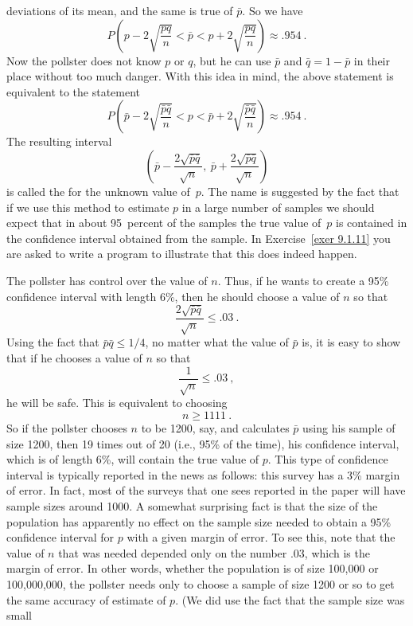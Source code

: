 \begin{example}
deviations of its mean, and the same is true of $\bar p$.  So we have
$$P\left(p - 2\sqrt{\frac{pq}{n}} < \bar p < p + 2\sqrt{\frac{pq}{n}}\right) \approx .954\
.$$
Now the pollster does not know $p$ or $q$, but he can use $\bar p$ and $\bar q = 1 -
\bar p$ in their place without too much danger.  With this idea in mind, the above
statement is equivalent to the statement
$$P\left(\bar p - 2\sqrt{\frac{\bar p \bar q}{n}} < p <
\bar p + 2\sqrt{\frac{\bar p \bar q}{n}}\right) \approx .954\ .$$
The resulting interval
$$
\left( \bar p - \frac {2\sqrt{\bar p \bar q}}{\sqrt n},\ 
\bar p + \frac {2\sqrt{\bar p \bar q}}{\sqrt n} \right)
$$
is called the  for the unknown
value of~$p$.  The name is suggested by the fact that if we use this method to
estimate $p$ in a large number of samples we should expect that in about
95~percent of the samples the true value of~$p$ is contained in the confidence
interval obtained from the sample.  In Exercise~\ref{exer 9.1.11} you are asked
to write a program to illustrate that this does indeed happen.
\par
The pollster has control over the value of $n$.  Thus, if he wants to create a 95\% confidence
interval with length 6\%, then he should choose a value of $n$ so that
$$\frac {2\sqrt{\bar p \bar q}}{\sqrt n} \le .03\ .$$
Using the fact that $\bar p \bar q \le 1/4$, no matter what the value of $\bar p$
is, it is easy to show that if he chooses a value of $n$ so that
$$\frac{1}{\sqrt n} \le .03\ ,$$
he will be safe.  This is equivalent to choosing
$$n \ge 1111\ .$$
So if the pollster chooses $n$ to be 1200, say, and calculates $\bar p$ using his
sample of size 1200, then 19 times out of 20 (i.e., 95\% of the time), his confidence interval,
which is of length 6\%, will contain the true value of $p$.  This type of confidence interval is
typically reported in the news as follows:  this survey has a 3\% margin of error.\index{margin
of error}  In fact, most of the surveys that one sees reported in the paper will have sample
sizes around 1000.  A somewhat surprising fact is that the size of the population has apparently
no effect on the sample size needed to obtain a 95\% confidence interval for $p$ with a given
margin of error.  To see this, note that the value of $n$ that was needed depended only on the
number .03, which is the margin of error.  In other words, whether the population is of size
100{,}000 or 100{,}000{,}000, the pollster needs only to choose a sample of size 1200 or so to
get the same accuracy of estimate of $p$.  (We did use the fact that the sample size was small

\end{example}
